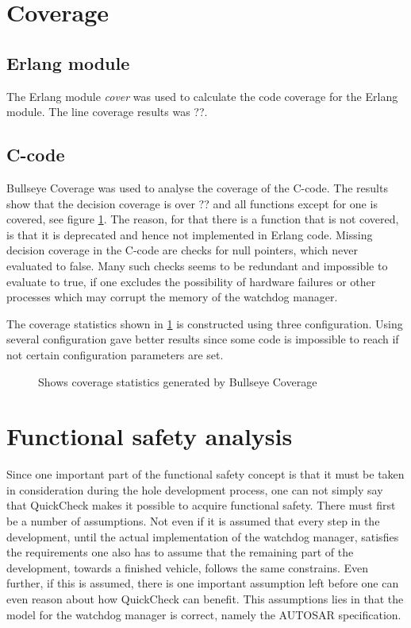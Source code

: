 \section{Coverage}
\subsection{Erlang module}
The Erlang module \emph{cover} was used to calculate the code coverage for the
Erlang module. The line coverage results was ??.    
\subsection{C-code}
Bullseye Coverage was used to analyse the coverage of the C-code. The results
show that the decision coverage is over ?? and all functions except for one is
covered, see figure \ref{FIG:BULLSEYE}. The reason, for that there is a function
that is not covered, is that it is deprecated and hence not implemented in Erlang
code. Missing decision coverage in the C-code are checks for null pointers,
which never evaluated to false. Many such checks seems to be redundant and
impossible to evaluate to true, if one
excludes the possibility of hardware failures or other processes which may
corrupt the memory of the watchdog manager.      

The coverage statistics shown in \ref{FIG:BULLSEYE} is constructed
using three configuration. Using several configuration gave better results since
some code is impossible to reach if not certain configuration parameters are set. 

\begin{figure}[!ht]
\caption{Shows coverage statistics generated by Bullseye Coverage}
\label{FIG:BULLSEYE}
\end{figure}


\section{Functional safety analysis}
Since one important part of the functional safety concept is that it must be
taken in consideration during the hole development process, one can not simply
say that QuickCheck makes it possible to acquire functional safety. There must
first be a number of assumptions. Not even if it is assumed that
every step in the development, until the actual implementation of the watchdog
manager, satisfies the requirements one also has to assume that the remaining
part of the development, towards a finished vehicle, follows the same
constrains. Even further, if this is assumed, there is one important
assumption left before
one can even reason about how QuickCheck can benefit.
This assumptions lies in that the model for the watchdog
manager is correct, namely the AUTOSAR specification.


